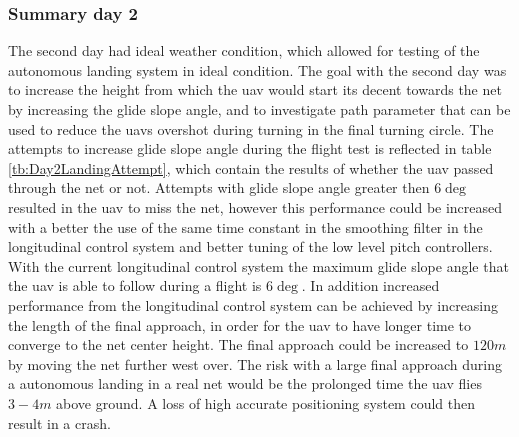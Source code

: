\subsubsection{Summary day 2}
The second day had ideal weather condition, which allowed for testing of the autonomous landing system in ideal condition. The goal with the second day was to increase the height from which the \gls{uav} would start its decent towards the net by increasing the glide slope angle, and to investigate path parameter that can be used to reduce the \gls{uav}s overshot during turning in the final turning circle. The attempts to increase glide slope angle during the flight test is reflected in table \ref{tb:Day2LandingAttempt}, which contain the results of whether the \gls{uav} passed through the net or not. Attempts with glide slope angle greater then $6 \deg$ resulted in the \gls{uav} to miss the net, however this performance could be increased with a better the use of the same time constant in the smoothing filter in the longitudinal control system and better tuning of the low level pitch controllers. With the current longitudinal control system the maximum glide slope angle that the \gls{uav} is able to follow during a flight is $6 \deg$. In addition increased performance from the longitudinal control system can be achieved by increasing the length of the final approach, in order for the \gls{uav} to have longer time to converge to the net center height. The final approach could be increased to $120 m$ by moving the net further west over. The risk with a large final approach during a autonomous landing in a real net would be the prolonged time the \gls{uav} flies $3-4 m$ above ground. A loss of high accurate positioning system could then result in a crash.

